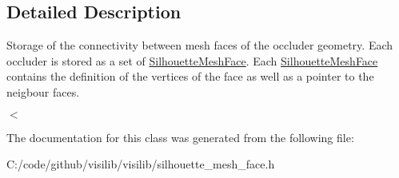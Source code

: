 \subsection{Detailed Description}
Storage of the connectivity between mesh faces of the occluder geometry. Each occluder is stored as a set of \mbox{\hyperlink{classvisilib_1_1_silhouette_mesh_face}{Silhouette\+Mesh\+Face}}. Each \mbox{\hyperlink{classvisilib_1_1_silhouette_mesh_face}{Silhouette\+Mesh\+Face}} contains the definition of the vertices of the face as well as a pointer to the neigbour faces. 

$<$ 

The documentation for this class was generated from the following file\+:\begin{DoxyCompactItemize}
\item 
C\+:/code/github/visilib/visilib/silhouette\+\_\+mesh\+\_\+face.\+h\end{DoxyCompactItemize}
